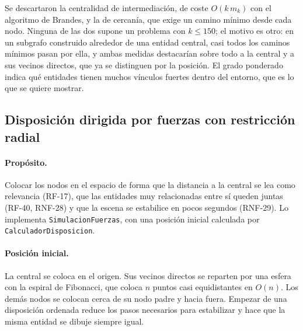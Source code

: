 Se descartaron la centralidad de intermediación, de coste $O(k\,m_k)$ con el algoritmo de Brandes, y la de cercanía, que exige un camino mínimo desde cada nodo. Ninguna de las dos supone un problema con $k\le150$; el motivo es otro: en un subgrafo construido alrededor de una entidad central, casi todos los caminos mínimos pasan por ella, y ambas medidas destacarían sobre todo a la central y a sus vecinos directos, que ya se distinguen por la posición. El grado ponderado indica qué entidades tienen muchos vínculos fuertes dentro del entorno, que es lo que se quiere mostrar. \cite{TODO}

\subsection{Disposición dirigida por fuerzas con restricción radial}
\label{sec:alg-fuerzas}

\paragraph{Propósito.} Colocar los nodos en el espacio de forma que la distancia a la central se lea como relevancia (RF-17), que las entidades muy relacionadas entre sí queden juntas (RF-40, RNF-28) y que la escena se estabilice en pocos segundos (RNF-29). Lo implementa \texttt{SimulacionFuerzas}, con una posición inicial calculada por \texttt{CalculadorDisposicion}.

\paragraph{Posición inicial.} La central se coloca en el origen. Sus vecinos directos se reparten por una esfera con la espiral de Fibonacci, que coloca $n$ puntos casi equidistantes en $O(n)$. Los demás nodos se colocan cerca de su nodo padre y hacia fuera. Empezar de una disposición ordenada reduce los pasos necesarios para estabilizar y hace que la misma entidad se dibuje siempre igual.

